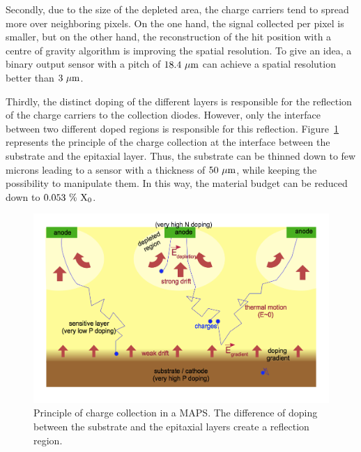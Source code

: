     Secondly, due to the size of the depleted area, the charge carriers tend to spread more over neighboring pixels.
    On the one hand, the signal collected per pixel is smaller, but on the other hand, the reconstruction of the hit position with a centre of gravity algorithm is improving the spatial resolution.
    To give an idea, a binary output sensor with a pitch of $18.4~\rm{\mu m}$ can achieve a spatial resolution better than $3~\rm{\mu m}$.

    Thirdly, the distinct doping of the different layers is responsible for the reflection of the charge carriers to the collection diodes.
    However, only the interface between two different doped regions is responsible for this reflection.
    Figure~\ref{fig:collectionEfield} represents the principle of the charge collection at the interface between the substrate and the epitaxial layer.
    Thus, the substrate can be thinned down to few microns leading to a sensor with a thickness of $50~\rm{\mu m}$, while keeping the possibility to manipulate them.
    In this way, the material budget can be reduced down to $0.053~\%~\rm{X_0}$.

    \begin{figure}
      \centering
      \includegraphics[width = \textwidth]{Pictures/vxd/collectionEfield.png}
      \caption{Principle of charge collection in a MAPS. The difference of doping between the substrate and the epitaxial layers create a reflection region.}
      \label{fig:collectionEfield}
    \end{figure}

